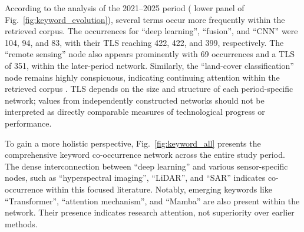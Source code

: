 \documentclass[]{interact}
\theoremstyle{plain}%
\theoremstyle{definition}
\theoremstyle{remark}
\DeclareRobustCommand{\DIFadd}[1]{{\protect\color{DIFaddcolor}\uwave{#1}}}
\DeclareRobustCommand{\DIFdel}[1]{{\protect\color{DIFdelcolor}\sout{#1}}}
\def\DIFadd#1{#1}%
\def\DIFdel#1{}%
\begin{document}
According to the analysis of the 2021--2025 period (\DIFdel{right} \DIFdel{portion}\hspace{0.33em}\DIFadd{lower} \DIFadd{panel} of Fig.~\ref{fig:keyword_evolution}), \DIFdel{research} \DIFdel{hotspots} \DIFdel{have} \DIFdel{further} \DIFdel{intensified} \DIFdel{around} \DIFdel{four} \DIFdel{distinct} \DIFdel{clusters} \DIFadd{several} \DIFadd{terms} \DIFadd{occur} \DIFadd{more} \DIFadd{frequently} \DIFadd{within} \DIFadd{the} \DIFadd{retrieved} \DIFadd{corpus}. The occurrences for ``deep learning'', ``fusion'', and ``CNN'' \DIFdel{soared} \DIFdel{to} \DIFadd{were} 104, 94, and 83, with their TLS reaching 422, 422, and 399, respectively. The ``remote sensing'' node also appears prominently with 69 occurrences and a TLS of 351, \DIFdel{serving} \DIFdel{as} \DIFadd{within} the \DIFdel{core} \DIFdel{infrastructural} \DIFdel{support} \DIFdel{upon} \DIFdel{which} \DIFdel{all} \DIFdel{thematic} \DIFdel{research} \DIFdel{is} \DIFdel{built} \DIFadd{later-period} \DIFadd{network}. Similarly, the ``land-cover classification'' node remains highly conspicuous, \DIFdel{confirming} \DIFdel{its} \DIFdel{status} \DIFdel{as} \DIFdel{a} \DIFdel{classic} \DIFdel{and} \DIFdel{continuously} \DIFdel{trending} \DIFdel{task} \DIFdel{in} \DIFadd{indicating} \DIFadd{continuing} \DIFadd{attention} \DIFadd{within} the \DIFdel{remote} \DIFdel{sensing} \DIFdel{domain} \DIFadd{retrieved} \DIFadd{corpus} \citep{cao2020urban}. \DIFadd{TLS} \DIFadd{depends} \DIFadd{on} \DIFadd{the} \DIFadd{size} \DIFadd{and} \DIFadd{structure} \DIFadd{of} \DIFadd{each} \DIFadd{period-specific} \DIFadd{network}\DIFadd{;} \DIFadd{values} \DIFadd{from} \DIFadd{independently} \DIFadd{constructed} \DIFadd{networks} \DIFadd{should} \DIFadd{not} \DIFadd{be} \DIFadd{interpreted} \DIFadd{as} \DIFadd{directly} \DIFadd{comparable} \DIFadd{measures} \DIFadd{of} \DIFadd{technological} \DIFadd{progress} \DIFadd{or} \DIFadd{performance}\DIFadd{.}

To gain a more holistic perspective, Fig.~\ref{fig:keyword_all} presents the comprehensive keyword co-occurrence network across the entire study period. The dense interconnection between ``deep learning'' and various sensor-specific nodes, such as ``hyperspectral imaging'', ``LiDAR'', and ``SAR'' \DIFdel{underscores} \DIFdel{a} \DIFdel{paradigm} \DIFdel{shift} \DIFdel{toward} \DIFdel{high-dimensional} \DIFdel{data} \DIFdel{processing} \DIFadd{indicates} \DIFadd{co-occurrence} \DIFadd{within} \DIFadd{this} \DIFadd{focused} \DIFadd{literature}. Notably, emerging keywords like ``Transformer'', ``attention mechanism'', and ``Mamba'' \DIFdel{occupy} \DIFdel{strategic} \DIFdel{positions} \DIFadd{are} \DIFadd{also} \DIFadd{present} within the network. \DIFdel{This} \DIFdel{suggests} \DIFdel{a} \DIFdel{transition} \DIFdel{from} \DIFdel{local} \DIFdel{feature} \DIFdel{extraction} \DIFdel{to} \DIFdel{global} \DIFdel{contextual} \DIFdel{modeling} \DIFdel{in} \DIFdel{LULC} \DIFdel{simulation} \DIFdel{tasks} \DIFadd{Their} \DIFadd{presence} \DIFadd{indicates} \DIFadd{research} \DIFadd{attention}\DIFadd{,} \DIFadd{not} \DIFadd{superiority} \DIFadd{over} \DIFadd{earlier} \DIFadd{methods}.
\end{document}
